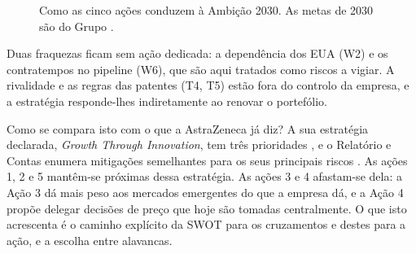 \begin{figure}[H]\centering
{}
\caption{Como as cinco ações conduzem à Ambição 2030. As metas de 2030 são do Grupo \cite[p.~10]{AR}.}
\label{fig:acoes}
\end{figure}
Duas fraquezas ficam sem ação dedicada: a dependência dos EUA (W2) e os contratempos no pipeline (W6), que são aqui tratados como riscos a vigiar. A rivalidade e as regras das patentes (T4, T5) estão fora do controlo da empresa, e a estratégia responde-lhes indiretamente ao renovar o portefólio.

Como se compara isto com o que a AstraZeneca já diz? A sua estratégia declarada, \textit{Growth Through Innovation}, tem três prioridades \cite[pp.~2, 10, 11]{AR}, e o Relatório e Contas enumera mitigações semelhantes para os seus principais riscos \cite[p.~48]{AR}. As ações 1, 2 e 5 mantêm-se próximas dessa estratégia. As ações 3 e 4 afastam-se dela: a Ação 3 dá mais peso aos mercados emergentes do que a empresa dá, e a Ação 4 propõe delegar decisões de preço que hoje são tomadas centralmente. O que isto acrescenta é o caminho explícito da SWOT para os cruzamentos e destes para a ação, e a escolha entre alavancas.

